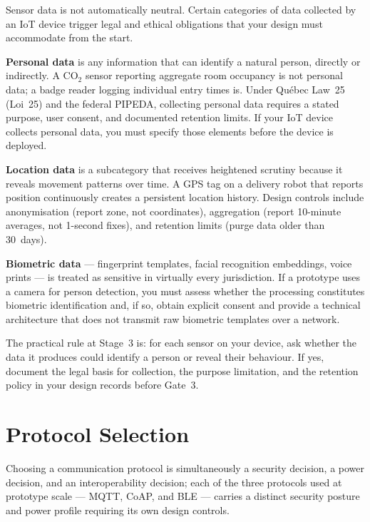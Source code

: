 Sensor data is not automatically neutral.
Certain categories of data collected by an IoT device trigger legal and ethical
obligations that your design must accommodate from the start.

\textbf{Personal data} is any information that can identify a
natural person, directly or indirectly.
A CO$_2$ sensor reporting aggregate room occupancy is not personal data; a badge
reader logging individual entry times is.
Under Qu\'{e}bec Law~25 (Loi~25) and the federal PIPEDA, collecting personal data
requires a stated purpose, user consent, and documented retention limits.
If your IoT device collects personal data, you must specify those elements before
the device is deployed.

\textbf{Location data} is a subcategory that receives
heightened scrutiny because it reveals movement patterns over time.
A GPS tag on a delivery robot that reports position continuously creates a
persistent location history.
Design controls include anonymisation (report zone, not coordinates), aggregation
(report 10-minute averages, not 1-second fixes), and retention limits (purge data
older than 30~days).

\textbf{Biometric data} --- fingerprint templates, facial
recognition embeddings, voice prints --- is treated as sensitive in virtually
every jurisdiction.
If a prototype uses a camera for person detection, you must assess whether the
processing constitutes biometric identification and, if so, obtain explicit consent
and provide a technical architecture that does not transmit raw biometric templates
over a network.

The practical rule at Stage~3 is: for each sensor on your device, ask whether the
data it produces could identify a person or reveal their behaviour.
If yes, document the legal basis for collection, the purpose limitation, and the
retention policy in your design records before Gate~3.

\section{Protocol Selection}
\label{sec:ch9-protocol}

Choosing a communication protocol is simultaneously a security decision, a power
decision, and an interoperability decision; each of the three protocols used at
prototype scale --- MQTT, CoAP, and BLE --- carries a distinct security posture
and power profile requiring its own design controls.

